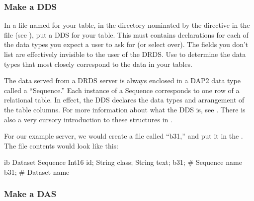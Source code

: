 \documentclass{dods-book}
\begin{document}
\subsubsection{Make a DDS}

In a file named for your table, in the directory nominated by the
 directive in the  file (see
\pageref{server,dodsini,example}), put a DDS for your table.  This
must contains declarations for each of the data types you expect a
user to ask for (or select over).  The fields you don't list are
effectively invisible to the user of the DRDS.  Use
 to determine the data types that
most closely correspond to the data in your tables.

The data served from a DRDS server is always enclosed in a DAP2 data
type called a ``Sequence.''  Each instance of a Sequence corresponds
to one row of a relational table.  In effect, the DDS declares the
data types and arrangement of the table columns.  For more information
about what the DDS is, see \DODSuser.   There is also a very cursory
introduction to these structures in \DODSquick.



For our example server, we would create a file called ``b31,'' and put
it in the .  The file contents would look like
this: 

\begin{vcode}{ib}
Dataset {
  Sequence {
    Int16 id;
    String class;
    String text;
  } b31;  # Sequence name
} b31;    # Dataset name
\end{vcode}
 
\subsubsection{Make a DAS}
\end{document}
